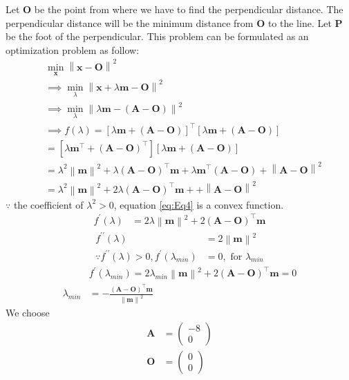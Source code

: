 \documentclass[12pt]{article}
\providecommand{\brak}[1]{\ensuremath{\left(#1\right)}}
\providecommand{\sbrak}[1]{\ensuremath{{}\left[#1\right]}}
\providecommand{\norm}[1]{\left\lVert#1\right\rVert}
\newcommand{\myvec}[1]{\ensuremath{\begin{pmatrix}#1\end{pmatrix}}}
\let\vec\mathbf
\begin{document}
\begin{enumerate}
Let $\vec{O}$ be the point from where we have to find the perpendicular distance. The perpendicular distance will be the minimum distance from $\vec{O}$ to the line. Let $\vec{P}$ be the foot of the perpendicular. This problem can be formulated as an optimization problem as follow:
\begin{align}
	\label{eq:Eq3}
	&  \min_{\vec{x}} \norm{\vec{x}-\vec{O}}^2\\
	& \implies \min_{\lambda} \norm{ \vec{x}+\lambda\vec{m} -\vec{O}}^2\\
	& \implies \min_{\lambda} \norm{ \lambda\vec{m} -\brak{\vec{A}-\vec{O}}}^2\\
	&\implies f\brak{\lambda} = \sbrak{\lambda\vec{m}+ \brak{\vec{A}-\vec{O}}}^\top \sbrak{\lambda\vec{m}+ \brak{\vec{A}-\vec{O}}} \\  
	&= \sbrak{\lambda\vec{m^\top}+ \brak{\vec{A}-\vec{O}}^\top} \sbrak{\lambda\vec{m}+ \brak{\vec{A}-\vec{O}}} \\  
	&= \lambda^2\norm{\vec{m}}^2+ \lambda\brak{\vec{A}-\vec{O}}^\top\vec{m}+ \lambda\vec{m}^\top\brak{\vec{A}-\vec{O}}+ \norm{\vec{A}-\vec{O}}^2 \\  
	\label{eq:Eq4}
	&= \lambda^2\norm{\vec{m}}^2+ 2\lambda\brak{\vec{A}-\vec{O}}^\top\vec{m}+ + \norm{\vec{A}-\vec{O}}^2  
\end{align}
$\because$ the coefficient of $\lambda^2> 0$, equation \eqref{eq:Eq4} is a convex function.
\begin{align}
	f^\prime\brak{\lambda} &= 2\lambda\norm{\vec{m}}^2+ 2\brak{\vec{A}-\vec{O}}^\top\vec{m}
\end{align}	
\begin{align}
	f^{\prime\prime}\brak{\lambda} &= 2\norm{\vec{m}}^2 \\ 
	\because f^{\prime\prime}\brak{\lambda} > 0, f^\prime\brak{\lambda_{min}} &= 0, \text{ for } \lambda_{min}
\end{align}
\begin{align}
	& f^\prime\brak{\lambda_{min}} =  2\lambda_{min}\norm{\vec{m}}^2 + 2\brak{\vec{A}-\vec{O}}^\top\vec{m}  = 0 \\
	\label{eq:EqMin}
	\lambda_{min} &= -\frac{\brak{\vec{A}-\vec{O}}^\top\vec{m}}{\norm{\vec{m}}^2} 
\end{align}
We choose  
\begin{align}
	\vec{A} &= \myvec{-8 \\ 0}\\
	\vec{O} &= \myvec{ 0 \\ 0}
\end{align}

\end{enumerate}
\end{document}
